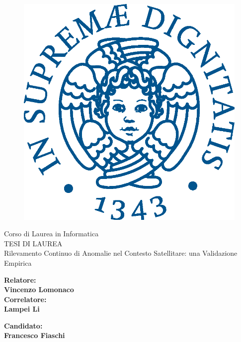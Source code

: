 \begin{titlepage}
\begin{figure}
    \centering\includegraphics[scale=0.5]{images/Frontespizio/cherubinFrontespizio.eps}
\end{figure}

\begin{center}
    {\LARGE{ Corso di Laurea in Informatica \\}}
    \vspace{2cm}
    {\Large { TESI DI LAUREA }}\\
    \vspace{2cm}
    {\Large { Rilevamento Continuo di Anomalie nel Contesto Satellitare: una Validazione Empirica }}
\end{center}

\vspace{2cm}

\begin{minipage}[t]{0.47\textwidth}
	{\large{\bf Relatore:\\ Vincenzo Lomonaco}}
	\vspace{0.5cm}
	{\large{\bf \\Correlatore:\\ Lampei Li}}
\end{minipage}\hfill\begin{minipage}[t]{0.47\textwidth}\raggedleft
	{\large{\bf Candidato: \\ Francesco Fiaschi\\ }}
\end{minipage}

\vspace{25mm}
\hrulefill
\\
\end{titlepage}